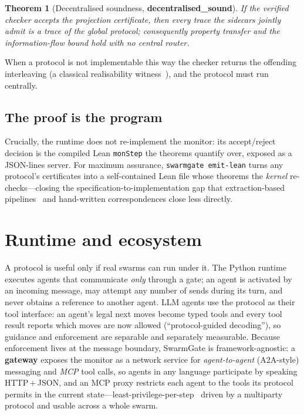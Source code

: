 \documentclass[10pt,twocolumn]{article}
\newtheorem{theorem}{Theorem}
\newcommand{\code}[1]{\texttt{\small #1}}
\newcommand{\thm}[1]{\textcolor{dk}{\textbf{#1}}}
\begin{document}
\begin{theorem}[Decentralised soundness, \thm{decentralised\_sound}]
If the verified checker accepts the projection certificate, then every trace the sidecars jointly admit is
a trace of the global protocol; consequently property transfer and the information-flow bound hold with no
central router.
\end{theorem}

When a protocol is not implementable this way the checker returns the offending interleaving (a classical
realisability witness~\cite{alur2005realizability,li2023complete}), and the protocol must run centrally.

\subsection{The proof is the program}

Crucially, the runtime does not re-implement the monitor: its accept/reject decision is the compiled Lean
\code{monStep} the theorems quantify over, exposed as a JSON-lines server. For maximum assurance,
\code{swarmgate emit-lean} turns any protocol's certificates into a self-contained Lean file whose theorems
the \emph{kernel} re-checks---closing the specification-to-implementation gap that extraction-based
pipelines~\cite{castroperez2021zooid} and hand-written correspondences close less directly.

\section{Runtime and ecosystem}

A protocol is useful only if real swarms can run under it. The Python runtime executes agents that
communicate \emph{only} through a gate; an agent is activated by an incoming message, may attempt any
number of sends during its turn, and never obtains a reference to another agent. LLM agents use the
protocol as their tool interface: an agent's legal next moves become typed tools and every tool result
reports which moves are now allowed (``protocol-guided decoding''), so guidance and enforcement are
separable and separately measurable. Because enforcement lives at the message boundary, SwarmGate is
framework-agnostic: a \textbf{gateway} exposes the monitor as a network service for \emph{agent-to-agent}
(A2A-style) messaging and \emph{MCP} tool calls, so agents in any language participate by speaking
HTTP\,+\,JSON, and an MCP proxy restricts each agent to the tools its protocol permits in the current
state---least-privilege-per-step~\cite{sikaroudi2026concordat} driven by a multiparty protocol and usable
across a whole swarm.
\end{document}
